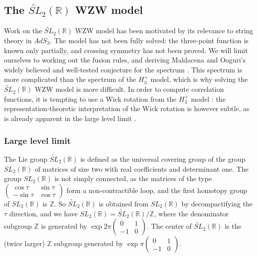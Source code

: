 \documentclass[12pt, a4paper, notitlepage, twoside]{report}
\numberwithin{equation}{section}
\theoremstyle{break}
\begin{document}
\subsection{The \texorpdfstring{$\widetilde{SL}_2(\mathbb{R})$}{SL2(R)} WZW model \label{secslr}}

Work on the $\widetilde{SL}_2(\mathbb{R})$ WZW model has been motivated by its relevance to string theory in $AdS_3$.
The model has not been fully solved: the three-point function is known only partially, and crossing symmetry has not been proved.
We will limit ourselves to working out the fusion rules, and deriving Maldacena and Ooguri's widely believed and well-tested conjecture for the spectrum \cite{mo00a}.
This spectrum is more complicated than the spectrum of the $H_3^+$ model, which is why solving the $\widetilde{SL}_2(\mathbb{R})$ WZW model is more difficult.
In order to compute correlation functions, it is tempting to use a Wick rotation from the $H_3^+$ model \cite{mo01}: the representation-theoretic interpretation of the Wick rotation is however subtle, as is already apparent in the large level limit \cite{rib09}. 

\subsubsection{Large level limit}

The Lie group \textbf{\boldmath $\widetilde{SL}_2(\mathbb{R})$} is defined as the universal covering group of the group $SL_2({\mathbb{R}})$ of matrices of size two with real coefficients and determinant one.
The group $SL_2({\mathbb{R}})$ is not simply connected, as the matrices of the type $\left(\begin{smallmatrix} \cos \tau & \sin\tau \\ -\sin\tau & \cos \tau \end{smallmatrix}\right)$ form a non-contractible loop, and the first homotopy group of $SL_2({\mathbb{R}})$ is ${\mathbb{Z}}$.
So $\widetilde{SL}_2(\mathbb{R})$ is obtained from $SL_2({\mathbb{R}})$ by decompactifying the $\tau$ direction, and we have $SL_2({\mathbb{R}}) = \widetilde{SL}_2(\mathbb{R})/{\mathbb{Z}}$, where the denominator subgroup $\mathbb{Z}$ is generated by $\exp 2\pi\left(\begin{smallmatrix} 0 & 1 \\ -1 & 0 \end{smallmatrix}\right)$. The center of $\widetilde{SL}_2(\mathbb{R})$ is the (twice larger) $\mathbb{Z}$ subgroup generated by $\exp\pi\left(\begin{smallmatrix} 0 & 1 \\ -1 & 0 \end{smallmatrix}\right)$.
\end{document}
